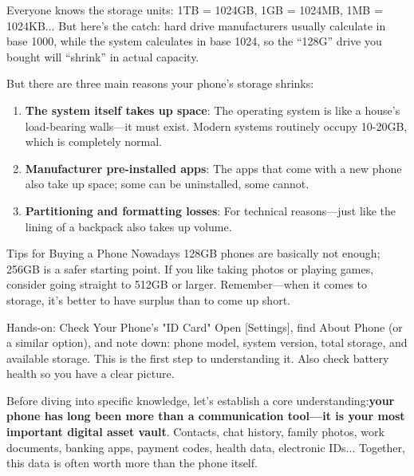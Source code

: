 
Everyone knows the storage units: 1TB = 1024GB, 1GB = 1024MB, 1MB = 1024KB... But here's the catch: hard drive manufacturers usually calculate in base 1000, while the system calculates in base 1024, so the “128G” drive you bought will “shrink” in actual capacity.

But there are three main reasons your phone's storage shrinks:

\begin{enumerate}
  \item \textbf{The system itself takes up space}: The operating system is like a house's load-bearing walls—it must exist. Modern systems routinely occupy 10-20GB, which is completely normal.
  \item \textbf{Manufacturer pre-installed apps}: The apps that come with a new phone also take up space; some can be uninstalled, some cannot.
  \item \textbf{Partitioning and formatting losses}: For technical reasons—just like the lining of a backpack also takes up volume.
\end{enumerate}

\begin{tcbinfo}{Tips for Buying a Phone}
Nowadays 128GB phones are basically not enough; 256GB is a safer starting point. If you like taking photos or playing games, consider going straight to 512GB or larger. Remember—when it comes to storage, it's better to have surplus than to come up short.

\end{tcbinfo}

\begin{tcbpractice}{Hands-on: Check Your Phone's "ID Card"}
Open [Settings], find About Phone (or a similar option), and note down: phone model, system version, total storage, and available storage. This is the first step to understanding it. Also check battery health so you have a clear picture.

\end{tcbpractice}


Before diving into specific knowledge, let's establish a core understanding:\textbf{your phone has long been more than a communication tool—it is your most important digital asset vault}. Contacts, chat history, family photos, work documents, banking apps, payment codes, health data, electronic IDs... Together, this data is often worth more than the phone itself.

